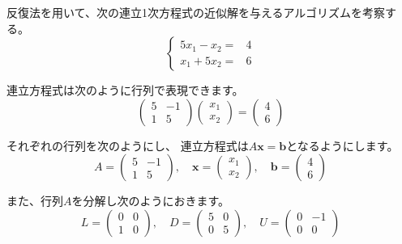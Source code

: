 \documentclass[12pt,b5paper]{ltjsarticle}
\begin{document}
反復法を用いて、次の連立1次方程式の近似解を与えるアルゴリズムを考察する。
\begin{equation}
 \begin{cases}
  5x_1 - x_2 =& 4\\
 x_1 + 5x_2 =& 6
 \end{cases}\label{154004_21Dec21}
\end{equation}
\dotfill

連立方程式は次のように行列で表現できます。
\begin{equation}
 \begin{pmatrix}
  5 & -1\\ 1 & 5
 \end{pmatrix}
 \begin{pmatrix}
  x_1\\ x_2
 \end{pmatrix}
 =
 \begin{pmatrix}
  4\\6
 \end{pmatrix}
\end{equation}

それぞれの行列を次のようにし、
連立方程式は$A\bm{x}=\bm{b}$となるようにします。
\begin{equation}
 A=
  \begin{pmatrix}
   5 & -1\\ 1 & 5
  \end{pmatrix}
  , \quad
  \bm{x}=
  \begin{pmatrix}
   x_1\\ x_2
  \end{pmatrix}
  , \quad
  \bm{b}=
  \begin{pmatrix}
   4\\6
  \end{pmatrix}
\end{equation}

また、行列$A$を分解し次のようにおきます。
\begin{equation}
 L=
  \begin{pmatrix}
   0 & 0\\ 1 & 0
  \end{pmatrix}
  , \quad
 D=
  \begin{pmatrix}
   5 & 0\\ 0 & 5
  \end{pmatrix}
  , \quad
 U=
  \begin{pmatrix}
   0 & -1\\ 0 & 0
  \end{pmatrix}
\end{equation}
\end{document}
